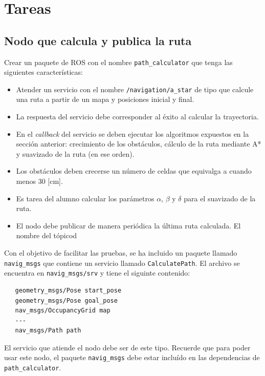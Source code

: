 \documentclass[letterpaper,12pt]{article}
\begin{document}
\section{Tareas}

\subsection{Nodo que calcula y publica la ruta}
Crear un paquete de ROS con el nombre \texttt{path_calculator} que tenga las siguientes características:
\begin{itemize}
\item Atender un servicio con el nombre \texttt{/navigation/a_star} de tipo que calcule una ruta a partir de un mapa y posiciones inicial y final. 
\item La respuesta del servicio debe corresponder al éxito al calcular la trayectoria.
\item En el \textit{callback} del servicio se deben ejecutar los algoritmos expuestos en la sección anterior: crecimiento de los obstáculos, cálculo de la ruta mediante A* y suavizado de la ruta (en ese orden).
\item Los obstáculos deben crecerse un número de celdas que equivalga a cuando menos 30 [cm].
\item Es tarea del alumno calcular los parámetros $\alpha$, $\beta$ y $\delta$ para el suavizado de la ruta.
\item El nodo debe publicar de manera periódica la última ruta calculada. El nombre del tópicod
\end{itemize}
Con el objetivo de facilitar las pruebas, se ha incluido un paquete llamado \texttt{navig_msgs} que contiene un servicio llamado \texttt{CalculatePath}. El archivo se encuentra en \texttt{navig_msgs/srv} y tiene el siguinte contenido:
\begin{verbatim}
   geometry_msgs/Pose start_pose
   geometry_msgs/Pose goal_pose
   nav_msgs/OccupancyGrid map
   ---
   nav_msgs/Path path
\end{verbatim}
El servicio que atiende el nodo debe ser de este tipo. Recuerde que para poder usar este nodo, el paquete \texttt{navig_msgs} debe estar incluído en las dependencias de \texttt{path_calculator}.
\end{document}
